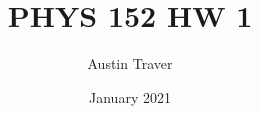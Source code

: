 \documentclass{article}
\title{PHYS 152 HW 1}
\author{Austin Traver}
\date{January 2021}
\begin{document}
\maketitle

\section{}
\subsection{}
\end{document}
